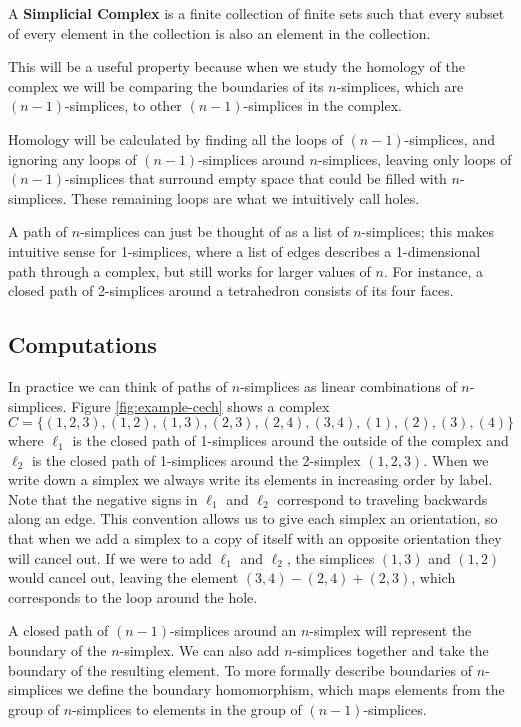 \begin{definition}\label{def:simplicial-complex}
    A \textbf{Simplicial Complex} is a finite collection of finite sets such that every subset of every element in the collection is also an element in the collection. \cite{wagner}
\end{definition}

This will be a useful property because when we study the homology of the complex we will be comparing the boundaries of its \(n\)-simplices, which are \((n-1)\)-simplices, to other \((n-1)\)-simplices in the complex.

Homology will be calculated by finding all the loops of \((n-1)\)-simplices, and ignoring any loops of \((n-1)\)-simplices around \(n\)-simplices, leaving only loops of \((n-1)\)-simplices that surround empty space that could be filled with \(n\)-simplices.
These remaining loops are what we intuitively call holes.

A path of \(n\)-simplices can just be thought of as a list of \(n\)-simplices; this makes intuitive sense for 1-simplices, where a list of edges describes a 1-dimensional path through a complex, but still works for larger values of \(n\).
For instance, a closed path of 2-simplices around a tetrahedron consists of its four faces.

\subsection{Computations}

In practice we can think of paths of \(n\)-simplices as linear combinations of \(n\)-simplices.
Figure \ref{fig:example-cech} shows a complex \(C = \{ (1,2,3), (1,2), (1,3), (2,3), (2,4), (3,4), (1), (2), (3), (4) \}\) where \(\ell_1\) is the closed path of 1-simplices around the outside of the complex and \(\ell_2\) is the closed path of 1-simplices around the 2-simplex \((1,2,3)\).
When we write down a simplex we always write its elements in increasing order by label.
Note that the negative signs in \(\ell_1\) and \(\ell_2\) correspond to traveling backwards along an edge.
This convention allows us to give each simplex an orientation, so that when we add a simplex to a copy of itself with an opposite orientation they will cancel out.
If we were to add \(\ell_1\) and \(\ell_2\), the simplices \((1, 3)\) and \((1, 2)\) would cancel out, leaving the element \((3, 4) - (2, 4) + (2, 3)\), which corresponds to the loop around the hole.

A closed path of \((n-1)\)-simplices around an \(n\)-simplex will represent the boundary of the \(n\)-simplex.
We can also add \(n\)-simplices together and take the boundary of the resulting element.
To more formally describe boundaries of \(n\)-simplices we define the boundary homomorphism, which maps elements from the group of \(n\)-simplices to elements in the group of \((n-1)\)-simplices.

